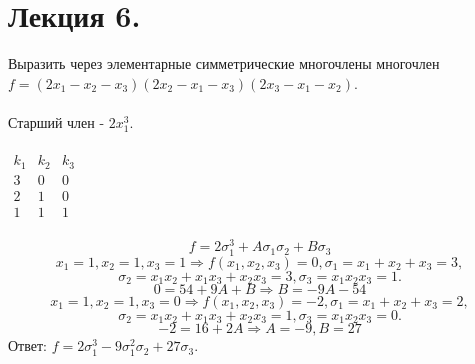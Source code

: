 \documentclass[12pt]{article}
\begin{document}
\section{Лекция 6.}
\begin{examp}
Выразить через элементарные симметрические многочлены многочлен $f = (2x_1 - x_2 - x_3)(2x_2 - x_1 - x_3)(2x_3 - x_1 - x_2)$. \\ \\
\indent Старший член - $2x_1^3$. \\ \\
$\begin{array}{c|c|c}
  k_1 & k_2 & k_3 \\ \hline
  3 & 0 & 0 \\
  2 & 1 & 0 \\
  1 & 1 & 1
\end{array}$ \\ \\
$$f = 2\sigma_1^3 + A\sigma_1\sigma_2 + B\sigma_3$$
$$x_1 = 1, x_2 = 1, x_3 = 1 \Rightarrow f(x_1,x_2,x_3) = 0, \sigma_1 = x_1 + x_2 + x_3 = 3,$$
$$\sigma_2 = x_1x_2 + x_1x_3 + x_2x_3 = 3, \sigma_3 = x_1x_2x_3 = 1.$$
$$0 = 54 + 9A + B \Rightarrow B = -9A - 54$$
$$x_1 = 1, x_2 = 1, x_3 = 0 \Rightarrow f(x_1,x_2,x_3) = -2, \sigma_1 = x_1 + x_2 + x_3 = 2,$$
$$\sigma_2 = x_1x_2 + x_1x_3 + x_2x_3 = 1, \sigma_3 = x_1x_2x_3 = 0.$$
$$-2 = 16 + 2A \Rightarrow A = -9, B = 27$$
Ответ: $f = 2\sigma_1^3  - 9\sigma_1^2\sigma_2 + 27\sigma_3$.
\end{examp}
\end{document}
